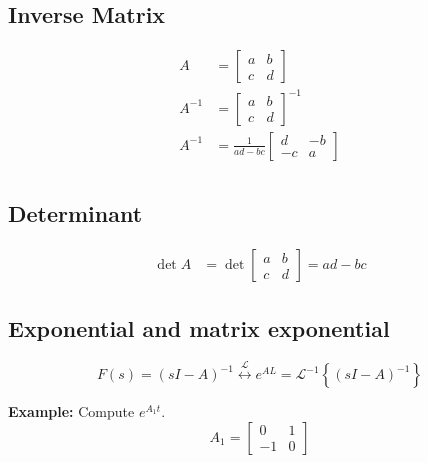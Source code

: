\begin{multicols}{2}
\subsection{Inverse Matrix}
\begin{align*}
    A &= \begin{bmatrix} a & b \\ c & d \end{bmatrix} \\
    A^{-1} &= \begin{bmatrix} a & b \\ c & d \end{bmatrix}^{-1} \\
    A^{-1} &= \frac{1}{ad-bc} \begin{bmatrix} d & -b \\ -c & a \end{bmatrix} \\
\end{align*}


\subsection{Determinant}
\begin{align*}
    \det{A} &= \det{\begin{bmatrix} a & b \\ c & d \end{bmatrix}} = ad-bc
\end{align*}


\subsection{Exponential and matrix exponential}

\begin{equation*}
    F(s)=(s I-A)^{-1} \stackrel{\mathcal{L}}{\longleftrightarrow} e^{A L}=\mathcal{L}^{-1}\left\{(s I-A)^{-1}\right\}
\end{equation*}


\textbf{Example:} Compute $e^{A_1 t}$.
\begin{equation*}
    A_1 = \begin{bmatrix} 0 & 1 \\ -1 & 0 \end{bmatrix}
\end{equation*}


\end{multicols}
